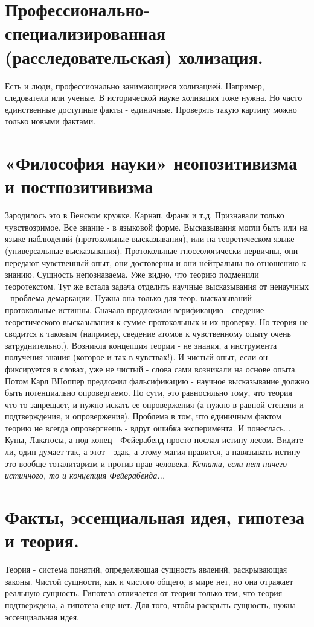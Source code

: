 \section{ Профессионально-специализированная (расследовательская) холизация.}
Есть и люди, профессионально занимающиеся холизацией. Например, следователи или ученые.
В исторической науке холизация тоже нужна. Но часто единственные доступные факты - единичные. Проверять такую картину можно только новыми фактами.

\section{ «Философия науки» неопозитивизма и постпозитивизма }
Зародилось это в Венском кружке. Карнап, Франк и т.д. Признавали только чувствозримое. Все знание - в языковой форме. Высказывания могли быть или на языке наблюдений (протокольные высказывания), или на теоретическом языке (универсальные высказывания). Протокольные гносеологически первичны, они передают чувственный опыт, они достоверны и они нейтральны по отношению к знанию. Сущность непознаваема. Уже видно, что теорию подменили теоротекстом. Тут же встала задача отделить научные высказывания от ненаучных - проблема демаркации. Нужна она только для теор. высказываний - протокольные истинны. Сначала предложили верификацию - сведение теоретического высказывания к сумме протокольных и их проверку. Но теория не сводится к таковым (например, сведение атомов к чувственному опыту очень затруднительно.). Возникла концепция теории - не знания, а инструмента получения знания (которое и так в чувствах!). И чистый опыт, если он фиксируется в словах, уже не чистый - слова сами возникали на основе опыта. Потом Карл ВПоппер предложил фальсификацию - научное высказывание должно быть потенциально опровергаемо. По сути, это равносильно тому, что теория что-то запрещает, и нужно искать ее опровержения (а нужно в равной степени и подтверждения, и опровержения). Проблема в том, что единичным фактом теорию не всегда опровергнешь - вдруг ошибка эксперимента. И понеслась... Куны, Лакатосы, а под конец - Фейерабенд просто послал истину лесом. Видите ли, один думает так, а этот - эдак, а этому магия нравится, а навязывать истину - это вообще тоталитаризм и против прав человека. \textit{Кстати, если нет ничего истинного, то и концепция Фейерабенда...}

\section{ Факты, эссенциальная идея, гипотеза и теория.}
Теория - система понятий, определяющая сущность явлений, раскрывающая законы. Чистой сущности, как и чистого общего, в мире нет, но она отражает реальную сущность. Гипотеза отличается от теории только тем, что теория подтверждена, а гипотеза еще нет. Для того, чтобы раскрыть сущность, нужна эссенциальная идея. 
 

